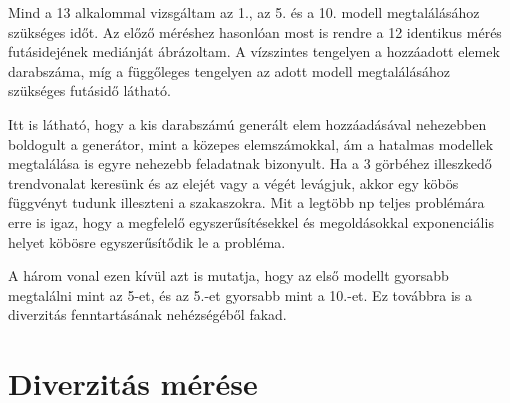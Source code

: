 Mind a 13 alkalommal vizsgáltam az 1., az 5. és a 10. modell megtalálásához szükséges időt. Az előző méréshez hasonlóan most is rendre a 12 identikus mérés futásidejének mediánját ábrázoltam. A vízszintes tengelyen a hozzáadott elemek darabszáma, míg a függőleges tengelyen az adott modell megtalálásához szükséges futásidő látható. 

Itt is látható, hogy a kis darabszámú generált elem hozzáadásával nehezebben boldogult a generátor, mint a közepes elemszámokkal, ám a hatalmas modellek megtalálása is egyre nehezebb feladatnak bizonyult. Ha a 3 görbéhez illeszkedő trendvonalat keresünk és az elejét vagy a végét levágjuk, akkor egy köbös függvényt tudunk illeszteni a szakaszokra. 
Mit a legtöbb np teljes problémára erre is igaz, hogy a megfelelő egyszerűsítésekkel és megoldásokkal exponenciális helyet köbösre egyszerűsítődik le a probléma.  

A három vonal ezen kívül azt is mutatja, hogy az első modellt gyorsabb megtalálni mint az 5-et, és az 5.-et gyorsabb mint a 10.-et. Ez továbbra is a diverzitás fenntartásának nehézségéből fakad.


\section{Diverzitás mérése}